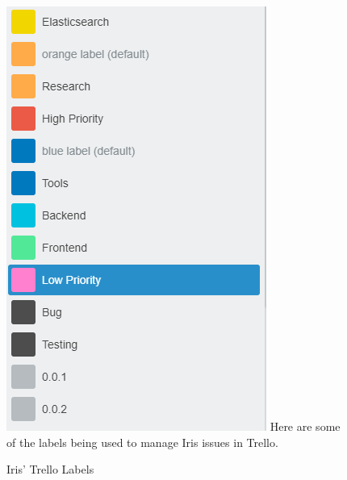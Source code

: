 \documentclass[12pt,a4paper,titlepage]{report}
\begin{document}
\begin{appendices}
\begin{figure}[H]
\begin{tcolorbox}
\includegraphics[width=\textwidth,height=0.7\textheight,keepaspectratio]{trello_labels}
\newline
Here are some of the labels being used to manage Iris issues in Trello.
\end{tcolorbox}
\caption{Iris’ Trello Labels}
\end{figure}


\end{appendices}
\end{document}
